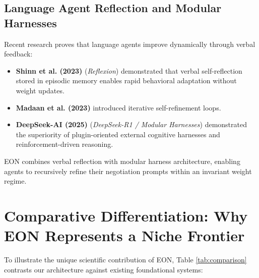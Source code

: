 \documentclass[11pt,a4paper]{article}
\begin{document}
\subsection{Language Agent Reflection and Modular Harnesses}
Recent research proves that language agents improve dynamically through verbal feedback:
\begin{itemize}[leftmargin=*]
    \item \textbf{Shinn et al. (2023)} \cite{shinn2023reflexion} (\textit{Reflexion}) demonstrated that verbal self-reflection stored in episodic memory enables rapid behavioral adaptation without weight updates.
    \item \textbf{Madaan et al. (2023)} \cite{madaan2023selfrefine} introduced iterative self-refinement loops.
    \item \textbf{DeepSeek-AI (2025)} \cite{deepseek2025r1} (\textit{DeepSeek-R1 / Modular Harnesses}) demonstrated the superiority of plugin-oriented external cognitive harnesses and reinforcement-driven reasoning.
\end{itemize}
EON combines verbal reflection with modular harness architecture, enabling agents to recursively refine their negotiation prompts within an invariant weight regime.

\section{Comparative Differentiation: Why EON Represents a Niche Frontier}
\label{sec:comparative_differentiation}

To illustrate the unique scientific contribution of EON, Table \ref{tab:comparison} contrasts our architecture against existing foundational systems:
\end{document}
